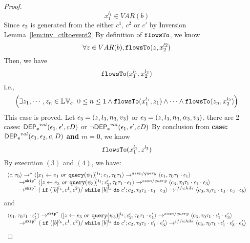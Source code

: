 \begin{proof}
 \[
  x_1^{l_1} \in VAR(b)
 \]
 Since $\mathtt{\epsilon}_2$ is generated from the either $c^1$, $c^2$ or $c'$ by {Inversion Lemma~\ref{lem:inv_ctltoevent2}}
 By definition of $\mathtt{flowsTo}$, we know
 \[
 \forall z \in VAR(b), \mathtt{flowsTo}(z, x_2^{l2})
 \]
 Then, we have
 \[
 \mathtt{flowsTo}(x_1^{l_1}, x_2^{l_2})
 \]
 i.e.,
 \[
 \Big( \exists z_1, \cdots, z_n \in \mathbb{LV}_{{c}}. ~ 0 \leq n \leq 1 \land
  \mathtt{flowsTo}(x_1^{l_1}, z_1) 
  \land \cdots \land \mathtt{flowsTo}(z_n, x_2^{l_2}) \Big)
 \]
  This case is proved.
%
\subcaseL{$\event_3 \in \eventset^{\asn}$}
Let $\mathtt{\epsilon}_3 = (z, l_3, n_3, v_3)$ or $\mathtt{\epsilon}_3 = (z, l_3, n_3, \alpha_3, v_3)$, there are 2 cases:
$\mathsf{DEP_{\mathtt{e}}}^{val}(\mathtt{\epsilon}_1, \mathtt{\epsilon}', c D)$ or $\neg \mathsf{DEP_{\mathtt{e}}}^{val}(\mathtt{\epsilon}_1, \mathtt{\epsilon}', c D)$
%
%
By conclusion from \textbf{case: $\mathsf{DEP_{\mathtt{e}}}^{val}(\mathtt{\epsilon}_1, \mathtt{\epsilon}_2, c, D)$ and $m = 0$}, we know
\[
  \mathtt{flowsTo}(x_1^{l_1}, z^{l_3})
\]
%
By execution $(3)$ and $(4)$, we have:
\[
  \begin{array}{l}   
  \langle {c}, \mathtt{\tau}_0 \rangle 
  \rightarrow^{*} 
  \langle [\mathrel{ {x}_1 \leftarrow e_1~ or ~ {\tt query}(\psi_1) }]^{l_1} ; {c}_1, \mathtt{\tau}_0 \mathtt{\tau}_1 \rangle  \rightarrow^{assn/query}
 \langle c_1, \mathtt{\tau}_0 \mathtt{\tau}_1 \cdot \mathtt{\epsilon}_1 \rangle 
  \\ 
  \qquad \rightarrow^{\mathtt{skip}^*} 
  \langle [\mathrel{ z \leftarrow e_3~ or ~ {\tt query}(\psi_3) }]^{l_3}; {c}_2', 
  \mathtt{\tau}_0 \mathtt{\tau}_1 \cdot \mathtt{\epsilon}_1 \rangle 
  \rightarrow^{assn / query} 
  \langle {c}_3,  \mathtt{\tau}_0 \mathtt{\tau}_1 \cdot \mathtt{\epsilon}_1 \cdot \mathtt{\epsilon}_3 \rangle 
  \\ 
  \qquad \rightarrow^{\mathtt{skip}^*} 
  \langle \;\mathtt{if}\;([b]{}^{l_b}, c^1, c^2) / \;\mathtt{while}\; [b]{}^{l_b} \;\mathtt{do}\; c'; {c}_2, 
  \mathtt{\tau}_0 \mathtt{\tau}_1 \cdot \mathtt{\epsilon}_1 \cdot \mathtt{\epsilon}_3 \rangle 
  \rightarrow^{if / while} 
  \langle {c}_3,  \mathtt{\tau}_0 \mathtt{\tau}_1 \cdot \mathtt{\epsilon}_1 \cdot \mathtt{\epsilon}_3 \cdot \mathtt{\epsilon}_b \rangle 
\end{array}
 \]
and 
 \[
  \begin{array}{l}   
  \langle c_1, \mathtt{\tau}_0 \mathtt{\tau}_1 \cdot \mathtt{\epsilon}_1' \rangle 
  \rightarrow^{\mathtt{skip}^*} 
  \langle [\mathrel{ z \leftarrow e_3~ or ~ {\tt query}(\psi_3) }]^{l_3}; {c}_2', 
  \mathtt{\tau}_0 \mathtt{\tau}_1 \cdot \mathtt{\epsilon}_1' \rangle 
  \rightarrow^{assn / query} 
  \langle {c}_3,  \mathtt{\tau}_0 \mathtt{\tau}_1 \cdot \mathtt{\epsilon}_1' \cdot \mathtt{\epsilon}_3' \rangle 
  \\ 
  \qquad \rightarrow^{\mathtt{skip}^*} 
  \langle \;\mathtt{if}\;([b]{}^{l_b}, c^1, c^2) / \;\mathtt{while}\; [b]{}^{l_b} \;\mathtt{do}\; c'; {c}_2, 
  \mathtt{\tau}_0 \mathtt{\tau}_1 \cdot \mathtt{\epsilon}_1' \cdot \mathtt{\epsilon}_3' \rangle 
  \rightarrow^{if / while} 
  \langle {c}_3,  \mathtt{\tau}_0 \mathtt{\tau}_1 \cdot \mathtt{\epsilon}_1' \cdot \mathtt{\epsilon}_3' \cdot \mathtt{\epsilon}_b' \rangle 

\end{array}\]
\end{proof}
